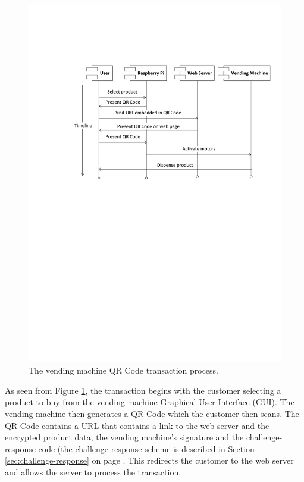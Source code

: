 \begin{figure}
 \centering 
 \includegraphics[clip=true, trim = 0 400 0 140, scale=0.7]{qrcode_processflow_user}
 \caption{The vending machine QR Code transaction process.}
 \label{fig:vm_prog_interaction}
\end{figure}

As seen from Figure \ref{fig:vm_prog_interaction}, the transaction begins with
the customer selecting a product to buy from the vending machine Graphical User
Interface (GUI). The vending machine then generates a QR Code which the customer
then scans. The QR Code contains a URL that contains a link to the web
server and the encrypted product data, the vending machine's signature and the
challenge-response code (the challenge-response scheme is described in Section
\ref{sec:challenge-response} on page \pageref{sec:challenge-response}. This
redirects the customer to the web server and allows the server to process the
transaction.

